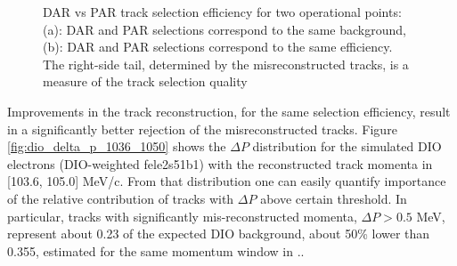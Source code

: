 \begin{figure}
\hspace{-0.6in}
\caption{
  \label{fig:mumem_dar_vs_par_ann}
  DAR vs PAR track selection efficiency for two operational points: 
  (a): DAR and PAR selections correspond to the same background, (b): DAR and PAR selections correspond
  to the same efficiency. \\
  The right-side tail, determined by the misreconstructed tracks, is a measure of the track selection quality 
}
\end{figure}

Improvements in the track reconstruction, for the same selection efficiency, result in a significantly better
rejection of the misreconstructed tracks. Figure \ref{fig:dio_delta_p_1036_1050} shows the $\Delta{P}$ distribution
for the simulated DIO electrons (DIO-weighted fele2s51b1) with the reconstructed track momenta
in [103.6, 105.0] MeV/c. From that distribution one can easily quantify importance of the relative contribution
of tracks with $\Delta{P}$ above certain threshold.  In particular, tracks with significantly mis-reconstructed
momenta, $\Delta{P} > 0.5$ MeV, represent about 0.23 of the expected DIO background, about 50\% lower than 0.355,
estimated for the same momentum window in \cite{MU2E_4595_ANN_TRAINING}..

